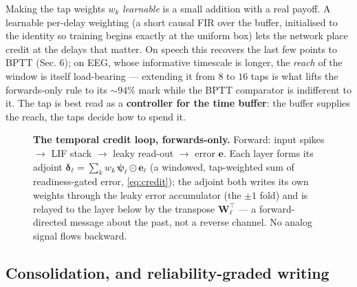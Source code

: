 \documentclass[11pt]{article}
\begin{document}
Making the tap weights \(w_k\) \emph{learnable} is a small addition with
a real payoff. A learnable per-delay weighting (a short causal FIR over
the buffer, initialised to the identity so training begins exactly at
the uniform box) lets the network place credit at the delays that
matter. On speech this recovers the last few points to BPTT (Sec. 6); on
EEG, whose informative timescale is longer, the \emph{reach} of the
window is itself load-bearing --- extending it from \(8\) to \(16\) taps
is what lifts the forwards-only rule to its \({\sim}94\%\) mark while
the BPTT comparator is indifferent to it. The tap is best read as a
\textbf{controller for the time buffer}: the buffer supplies the reach,
the taps decide how to spend it.

\begin{figure}[t]
\centering
{}
\caption{\textbf{The temporal credit loop, forwards-only.} Forward: input spikes $\to$ LIF stack $\to$ leaky read-out $\to$ error $\bm e$. Each layer forms its adjoint $\bm\delta_\ell=\sum_k w_k\,\bm\psi_\ell\odot\bm e_\ell$ (a windowed, tap-weighted sum of readiness-gated error, \eqref{eq:credit}); the adjoint both writes its own weights through the leaky error accumulator (the $\pm1$ fold) and is relayed to the layer below by the transpose $\bm W_\ell^{\!\top}$ --- a forward-directed message about the past, not a reverse channel. No analog signal flows backward.}
\label{fig:dataflow}
\end{figure}

\hypertarget{sec:consolidate}{%
\subsection{Consolidation, and reliability-graded
writing}\label{sec:consolidate}}
\end{document}
